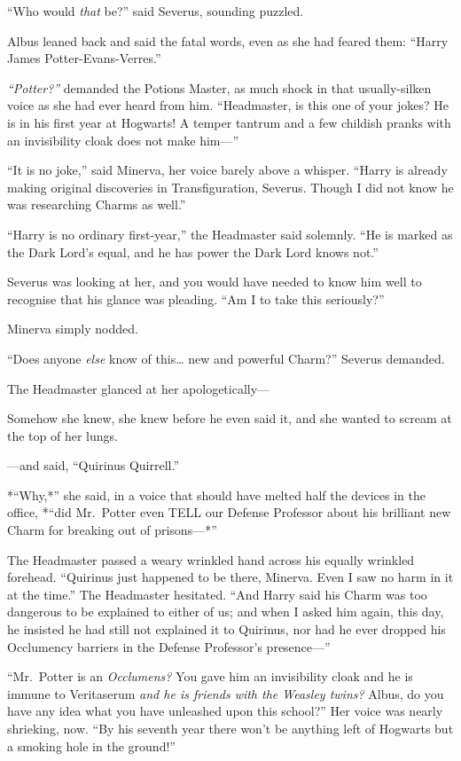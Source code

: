 ``Who would \emph{that} be?'' said Severus, sounding puzzled.

Albus leaned back and said the fatal words, even as she had feared them:
``Harry James Potter-Evans-Verres.''

\emph{``Potter?''} demanded the Potions Master, as much shock in that
usually-silken voice as she had ever heard from him. ``Headmaster, is
this one of your jokes? He is in his first year at Hogwarts! A temper
tantrum and a few childish pranks with an invisibility cloak does not
make him---''

``It is no joke,'' said Minerva, her voice barely above a whisper.
``Harry is already making original discoveries in Transfiguration,
Severus. Though I did not know he was researching Charms as well.''

``Harry is no ordinary first-year,'' the Headmaster said solemnly. ``He
is marked as the Dark Lord's equal, and he has power the Dark Lord knows
not.''

Severus was looking at her, and you would have needed to know him well
to recognise that his glance was pleading. ``Am I to take this
seriously?''

Minerva simply nodded.

``Does anyone \emph{else} know of this\ldots{} new and powerful Charm?''
Severus demanded.

The Headmaster glanced at her apologetically---

Somehow she knew, she knew before he even said it, and she wanted to
scream at the top of her lungs.

---and said, ``Quirinus Quirrell.''

*``Why,*'' she said, in a voice that should have melted half the devices
in the office, *``did Mr.~Potter even TELL our Defense Professor about
his brilliant new Charm for breaking out of prisons---*''

The Headmaster passed a weary wrinkled hand across his equally wrinkled
forehead. ``Quirinus just happened to be there, Minerva. Even I saw no
harm in it at the time.'' The Headmaster hesitated. ``And Harry said his
Charm was too dangerous to be explained to either of us; and when I
asked him again, this day, he insisted he had still not explained it to
Quirinus, nor had he ever dropped his Occlumency barriers in the Defense
Professor's presence---''

``Mr.~Potter is an \emph{Occlumens?} You gave him an invisibility cloak
and he is immune to Veritaserum \emph{and he is friends with the Weasley
twins?} Albus, do you have any idea what you have unleashed upon this
school?'' Her voice was nearly shrieking, now. ``By his seventh year
there won't be anything left of Hogwarts but a smoking hole in the
ground!''

